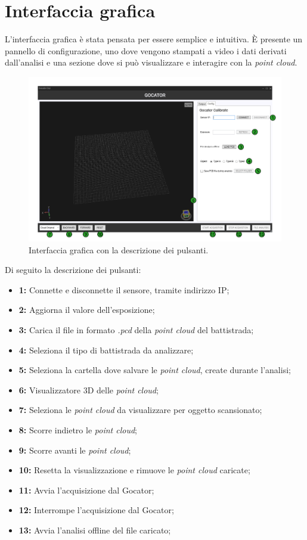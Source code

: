 \section{Interfaccia grafica}
L'interfaccia grafica è stata pensata per essere semplice e intuitiva. È presente un pannello di configurazione, uno dove vengono stampati a video i dati derivati dall'analisi e una sezione dove si può visualizzare e interagire con la \textit{point cloud}.

\begin{figure}[H]
	\centering
	\includegraphics[width=1.0\columnwidth]{./pictures/gui_1.png}
	\caption{Interfaccia grafica con la descrizione dei pulsanti.}\label{fig:gui_1}
\end{figure}

\noindent Di seguito la descrizione dei pulsanti:

\begin{itemize}
	\item \textbf{1:} Connette e disconnette il sensore, tramite indirizzo IP;
	\item \textbf{2:} Aggiorna il valore dell'esposizione;
	\item \textbf{3:} Carica il file in formato \textit{.pcd} della \textit{point cloud} del battistrada;
	\item \textbf{4:} Seleziona il tipo di battistrada da analizzare;
	\item \textbf{5:} Seleziona la cartella dove salvare le \textit{point cloud}, create durante l'analisi;
	\item \textbf{6:} Visualizzatore 3D delle \textit{point cloud};
	\item \textbf{7:} Seleziona le \textit{point cloud} da visualizzare per oggetto scansionato;
	\item \textbf{8:} Scorre indietro le \textit{point cloud};
	\item \textbf{9:} Scorre avanti le \textit{point cloud};
	\item \textbf{10:} Resetta la visualizzazione e rimuove le \textit{point cloud} caricate;
	\item \textbf{11:} Avvia l'acquisizione dal Gocator;
	\item \textbf{12:} Interrompe l'acquisizione dal Gocator;
	\item \textbf{13:} Avvia l'analisi offline del file caricato;
\end{itemize}


